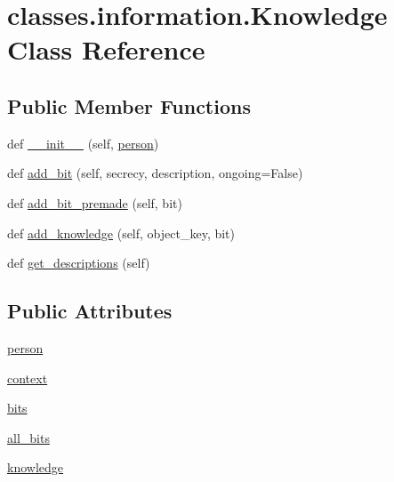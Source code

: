 \hypertarget{classclasses_1_1information_1_1Knowledge}{}\section{classes.\+information.\+Knowledge Class Reference}
\label{classclasses_1_1information_1_1Knowledge}
\subsection*{Public Member Functions}
\begin{DoxyCompactItemize}
\item 
def \hyperlink{classclasses_1_1information_1_1Knowledge_afd87a5fe14b2ff72ce146cfab9232b9a}{\+\_\+\+\_\+init\+\_\+\+\_\+} (self, \hyperlink{classclasses_1_1information_1_1Knowledge_a920b41c156123c8da6ef7d4985558f57}{person})
\item 
def \hyperlink{classclasses_1_1information_1_1Knowledge_a8dc237d26b1b26f80396a08fa8bcf0a7}{add\+\_\+bit} (self, secrecy, description, ongoing=False)
\item 
def \hyperlink{classclasses_1_1information_1_1Knowledge_a05737ddbc5f24d0500fffe4dccc2f2a7}{add\+\_\+bit\+\_\+premade} (self, bit)
\item 
def \hyperlink{classclasses_1_1information_1_1Knowledge_ad271a6173d93d5f3f12e8586cdebe14b}{add\+\_\+knowledge} (self, object\+\_\+key, bit)
\item 
def \hyperlink{classclasses_1_1information_1_1Knowledge_a75da2ba98f116df1a90fe465ba15105e}{get\+\_\+descriptions} (self)
\end{DoxyCompactItemize}
\subsection*{Public Attributes}
\begin{DoxyCompactItemize}
\item 
\hyperlink{classclasses_1_1information_1_1Knowledge_a920b41c156123c8da6ef7d4985558f57}{person}
\item 
\hyperlink{classclasses_1_1information_1_1Knowledge_a11f45ac6068fd7ca19834d7a26371b22}{context}
\item 
\hyperlink{classclasses_1_1information_1_1Knowledge_a4765ea57c3a0095f3bd23b61759c9848}{bits}
\item 
\hyperlink{classclasses_1_1information_1_1Knowledge_a334ffacb61e6651b9d26b6e270eb8842}{all\+\_\+bits}
\item 
\hyperlink{classclasses_1_1information_1_1Knowledge_a570ec290e5edc3cff3bc487f26fa5a97}{knowledge}
\end{DoxyCompactItemize}


